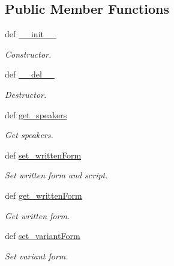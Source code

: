 \subsection*{Public Member Functions}
\begin{DoxyCompactItemize}
\item 
def \hyperlink{classlmf_1_1src_1_1core_1_1form__representation_1_1_form_representation_ab034318ab1492fac033d745860e18a37}{\+\_\+\+\_\+init\+\_\+\+\_\+}
\begin{DoxyCompactList}\small\item\em Constructor. \end{DoxyCompactList}\item 
def \hyperlink{classlmf_1_1src_1_1core_1_1form__representation_1_1_form_representation_a577b5258bf8f64ff889f0588cf0c8eda}{\+\_\+\+\_\+del\+\_\+\+\_\+}
\begin{DoxyCompactList}\small\item\em Destructor. \end{DoxyCompactList}\item 
def \hyperlink{classlmf_1_1src_1_1core_1_1form__representation_1_1_form_representation_a348d8eb39ef5bda7789106c9f5fe7755}{get\+\_\+speakers}
\begin{DoxyCompactList}\small\item\em Get speakers. \end{DoxyCompactList}\item 
def \hyperlink{classlmf_1_1src_1_1core_1_1form__representation_1_1_form_representation_a6166eda0284220bf82631f18427c9853}{set\+\_\+written\+Form}
\begin{DoxyCompactList}\small\item\em Set written form and script. \end{DoxyCompactList}\item 
def \hyperlink{classlmf_1_1src_1_1core_1_1form__representation_1_1_form_representation_a6fe50ce35eca4096614e5437aa957922}{get\+\_\+written\+Form}
\begin{DoxyCompactList}\small\item\em Get written form. \end{DoxyCompactList}\item 
def \hyperlink{classlmf_1_1src_1_1core_1_1form__representation_1_1_form_representation_af556c7aa6c243038ba8239ef03e2689b}{set\+\_\+variant\+Form}
\begin{DoxyCompactList}\small\item\em Set variant form. \end{DoxyCompactList}\item 

\end{DoxyCompactItemize}
